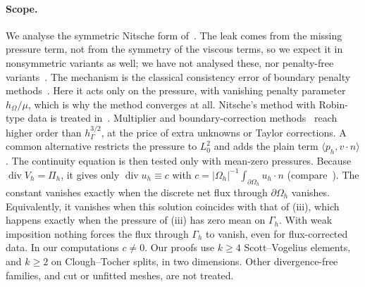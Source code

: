 \paragraph{Scope.}
We analyse the symmetric Nitsche form of~\cite{GjerdeScott2024}. The leak comes from the missing pressure term, not from the symmetry of the viscous terms, so we expect it in nonsymmetric variants as well; we have not analysed these, nor penalty-free variants~\cite{FreundStenberg1995,Burman2012,BoiveauBurman2016}. The mechanism is the classical consistency error of boundary penalty methods~\cite{Babuska1973}. Here it acts only on the pressure, with vanishing penalty parameter $h_\Omega/\mu$, which is why the method converges at all. Nitsche's method with Robin-type data is treated in~\cite{JuntunenStenberg2009}.
Multiplier and boundary-correction methods~\cite{LiuNeilanOtus2023,BurmanHansboLarson2024,BrambleDupontThomee1972,DupontGuzmanScott2025} reach higher order than $h_\Gamma^{3/2}$, at the price of extra unknowns or Taylor corrections.
A common alternative restricts the pressure to $L^2_0$ and adds the plain term $\langle p_h,v\cdot n\rangle$. The continuity equation is then tested only with mean-zero pressures. Because $\operatorname{div}V_h=\Pi_h$, it gives only $\operatorname{div}u_h\equiv c$ with $c=|\Omega_h|^{-1}\int_{\partial\Omega_h}u_h\cdot n$ (compare~\cite[(5.9)]{FrachonNilssonZahedi2024}). The constant vanishes exactly when the discrete net flux through $\partial\Omega_h$ vanishes. Equivalently, it vanishes when this solution coincides with that of (iii), which happens exactly when the pressure of (iii) has zero mean on $\Gamma_h$. With weak imposition nothing forces the flux through $\Gamma_h$ to vanish, even for flux-corrected data. In our computations $c\neq0$.
Our proofs use $k\ge4$ Scott--Vogelius elements, and $k\ge2$ on Clough--Tocher splits, in two dimensions. Other divergence-free families, and cut or unfitted meshes, are not treated.
